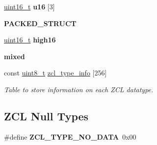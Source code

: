\begin{DoxyCompactItemize}
\item 
\hypertarget{group__zcl__types_ga41b61059ce2e09f103fbd64c9abe5bff}{\hyperlink{group__hal_ga5a8b2dc9e45a9ee81a94ef304fb62505}{uint16\-\_\-t} {\bfseries u16} \mbox{[}3\mbox{]}}\label{group__zcl__types_ga41b61059ce2e09f103fbd64c9abe5bff}

\item 
{\bfseries P\-A\-C\-K\-E\-D\-\_\-\-S\-T\-R\-U\-C\-T}
\item 
\hypertarget{group__zcl__types_ga8496547ebd48f63b4a6d8a8bd059c89e}{\hyperlink{group__hal_ga5a8b2dc9e45a9ee81a94ef304fb62505}{uint16\-\_\-t} {\bfseries high16}}\label{group__zcl__types_ga8496547ebd48f63b4a6d8a8bd059c89e}

\item 
\hypertarget{group__zcl__types_ga1c5d0403e0a7a57d3778e56e8798faa8}{{\bfseries mixed}}\label{group__zcl__types_ga1c5d0403e0a7a57d3778e56e8798faa8}

\item 
const \hyperlink{group__hal_gae1affc9ca37cfb624959c866a73f83c2}{uint8\-\_\-t} \hyperlink{group__zcl__types_ga0f5737f60f1f37fb3b375e9fd5fe664d}{zcl\-\_\-type\-\_\-info} \mbox{[}256\mbox{]}
\begin{DoxyCompactList}\small\item\em Table to store information on each Z\-C\-L datatype. \end{DoxyCompactList}\end{DoxyCompactItemize}
\subsection*{Z\-C\-L Null Types}
\begin{DoxyCompactItemize}
\item 
\hypertarget{group__zcl__types_ga6f933afd1ace68cae2aec5373a960a72}{\#define {\bfseries Z\-C\-L\-\_\-\-T\-Y\-P\-E\-\_\-\-N\-O\-\_\-\-D\-A\-T\-A}~0x00}\label{group__zcl__types_ga6f933afd1ace68cae2aec5373a960a72}

\end{DoxyCompactItemize}
